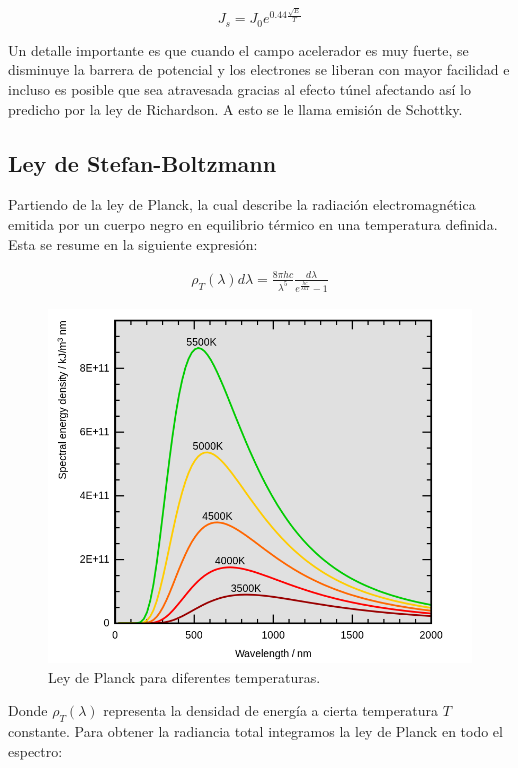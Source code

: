 \documentclass[%
 reprint,
 amsmath,amssymb,
 aps,
]{revtex4-2}
\begin{document}
\begin{equation}
    J_s=J_0e^{0.44\frac{\sqrt{E}}{T}}
    \label{eq: Densidad corriente campo cero}
\end{equation}

\vspace{0.2 cm}
 Un detalle importante es que cuando el campo acelerador es muy fuerte, se disminuye la barrera de potencial y los electrones se liberan con mayor facilidad e incluso es posible que sea atravesada gracias al efecto túnel afectando así lo predicho por la ley de Richardson. A esto se le llama emisión de Schottky.

\subsection{Ley de Stefan-Boltzmann}

Partiendo de la ley de Planck, la cual describe la radiación electromagnética emitida por un cuerpo negro en equilibrio térmico en una temperatura definida. Esta se resume en la siguiente expresión:

\begin{align*}
    \rho_{T}(\lambda)d\lambda = \frac{8\pi h c}{\lambda^{5}}\frac{d\lambda}{e^{\frac{hc}{\lambda kT}}-1}
\end{align*}

\begin{figure}[H]
    \centering
    \includegraphics[width=0.8\linewidth]{imagenes/Wiens_law.png}
    \caption{Ley de Planck para diferentes temperaturas.}
    \label{fig:enter-label}
\end{figure}


\vspace{0.2 cm}
Donde $\rho_{T}(\lambda)$ representa la densidad de energía a cierta temperatura $T$ constante. Para obtener la radiancia total integramos la ley de Planck en todo el espectro:
\end{document}
